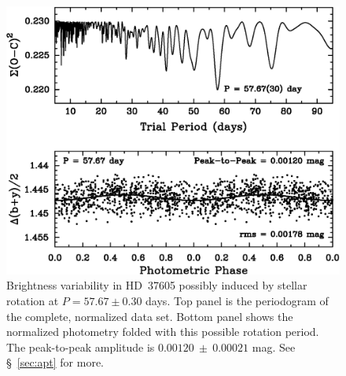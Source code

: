 \begin{figure}
\includegraphics[scale=0.8]{37605/f6.eps}
\caption{Brightness variability in HD~37605 possibly induced by
  stellar rotation at $P = 57.67 \pm 0.30$ days.  Top panel is the
  periodogram of the complete, normalized data set.  Bottom panel
  shows the normalized photometry folded with this possible rotation
  period. The peak-to-peak amplitude is $0.00120~\pm~0.00021$ mag.
  See \S~\ref{sec:apt} for more.
\label{rotation}}
\end{figure}


